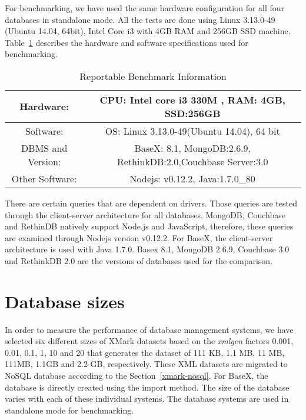 For benchmarking, we have used the same hardware configuration for all four databases in standalone mode. All the tests are done using  Linux 3.13.0-49 (Ubuntu 14.04, 64bit), Intel Core i3 with 4GB RAM and 256GB SSD machine.
Table~\ref{benchmark-configuration-table} describes the hardware and software specifications used for benchmarking. 
\begin{table}[h]	
	\centering
	\caption{Reportable Benchmark Information}
	\begin{tabular}{|c|c|c|c} 
		\hline
		Hardware: & \multicolumn{3}{p{8cm}|}{CPU: Intel core i3 330M , RAM: 4GB, SSD:256GB  } \\
		\hline
		Software: & \multicolumn{3}{p{8cm}|}{OS: Linux 3.13.0-49(Ubuntu 14.04), 64 bit} \\
		\hline
		DBMS and Version: & \multicolumn{3}{p{8cm}|}{ BaseX: 8.1, MongoDB:2.6.9, RethinkDB:2.0,Couchbase Server:3.0 } \\
		\hline
		Other Software: & \multicolumn{3}{|c|}{Nodejs: v0.12.2, Java:1.7.0\_80 } \\
		\hline
	\end{tabular}	
	\label{benchmark-configuration-table}
\end{table}
There are certain queries that are dependent on drivers. Those queries are tested through the client-server architecture for all databases. MongoDB, Couchbase and RethinDB natively support Node.js and JavaScript, therefore, these queries are examined through Nodejs version  v0.12.2. For BaseX, the client-server architecture is used with Java 1.7.0. Basex 8.1, MongoDB 2.6.9, Couchbase 3.0 and RethinkDB 2.0 are the versions of databases used for the comparison. 
\par
\section{Database sizes}\label{benchmark-database-size}
In order to measure the performance of database management systems, we have selected six different sizes of XMark datasets based on the \textit{xmlgen} factors 0.001, 0.01, 0.1, 1, 10 and 20 that generates the dataset of 111 KB, 1.1 MB, 11 MB, 111MB, 1.1GB and 2.2 GB, respectively. These XML datasets are migrated to NoSQL database according to the Section~\ref{xmark-nosql}. For BaseX, the database is directly created using the import method. The size of the database varies with each of these individual systems. The database systems are used in standalone mode for benchmarking.
